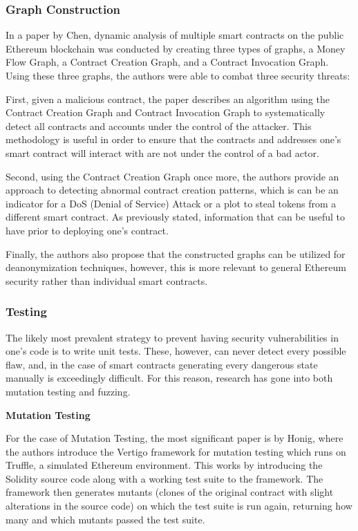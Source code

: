 \documentclass[letterpaper,twocolumn,10pt]{article}
\begin{document}
\subsubsection{Graph Construction}
In a paper by Chen, dynamic analysis of multiple smart contracts on the public Ethereum blockchain was conducted by creating three types of graphs, a Money Flow Graph, a Contract Creation Graph, and a Contract Invocation Graph. Using these three graphs, the authors were able to combat three security threats: 

\noindent First, given a malicious contract, the paper describes an algorithm using the Contract Creation Graph and Contract Invocation Graph to systematically detect all contracts and accounts under the control of the attacker. This methodology is useful in order to ensure that the contracts and addresses one's smart contract will interact with are not under the control of a bad actor.

\noindent Second, using the Contract Creation Graph once more, the authors provide an approach to detecting abnormal contract creation patterns, which is can be an indicator for a DoS (Denial of Service) Attack or a plot to steal tokens from a different smart contract. As previously stated, information that can be useful to have prior to deploying one's contract.

\noindent Finally, the authors also propose that the constructed graphs can be utilized for deanonymization techniques, however, this is more relevant to general Ethereum security rather than individual smart contracts.

\subsubsection{Testing}
The likely most prevalent strategy to prevent having security vulnerabilities in one's code is to write unit tests. These, however, can never detect every possible flaw, and, in the case of smart contracts generating every dangerous state manually is exceedingly difficult. For this reason, research has gone into both mutation testing and fuzzing. \linebreak



{\noindent \bf Mutation Testing}

\noindent For the case of Mutation Testing, the most significant paper is by Honig, where the authors introduce the Vertigo framework for mutation testing which runs on Truffle, a simulated Ethereum environment. This works by introducing the Solidity source code along with a working test suite to the framework. The framework then generates mutants (clones of the original contract with slight alterations in the source code) on which the test suite is run again, returning how many and which mutants passed the test suite.
\end{document}
